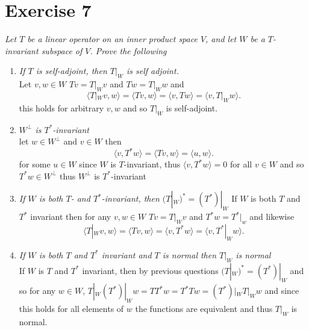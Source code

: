 \documentclass{article}
\begin{document}
    \section{Exercise 7}
    \emph{
        Let $T$ be a linear operator on an inner product space $V$, and let $W$ be a $T$-invariant
        subspace of $V$. Prove the following
    }
    \begin{enumerate}[label = (\alph*)]
        \item \emph{If $T$ is self-adjoint, then $T|_W$ is self adjoint.}\\
            Let $v,w \in W$
            $Tv = T|_Wv$ and $Tw = T|_Ww$ and
             \[
            \langle T|_W v, w \rangle = \langle Tv, w \rangle = \langle v, Tw \rangle = \langle v, T|_Ww \rangle
            .\] 
            this holds for arbitrary $v,w$ and so $T|_W$ is self-adjoint.
        \item \emph{ $W^{\perp}$ is $T^{*}$-invariant}\\
            let  $w \in W^{\perp}$ and $v \in W$ then
            \[
            \langle v, T^{*}w \rangle =\langle Tv, w \rangle = \langle u, w \rangle
            .\] 
            for some  $u \in W$ since  $W$ is $T$-invariant, thus $\langle v, T^{*}w \rangle = 0$ for all $v \in W$
            and so  $T^{*}w \in W^{\perp}$ thus $W^{\perp}$ is $T^{*}$-invariant
        \item \emph{ If $W$ is both $T$- and $T^{*}$-invariant, then $(T|_W)^{*} = (T^{*})|_W$}
            If $W$ is both $T$ and $T^{*}$ invariant then
            for any $v,w \in W$ $Tv = T|_Wv$ and $T^{*}w = T^{*}|_w$ and likewise
            \[
            \langle T|_W v,w \rangle = \langle Tv, w \rangle = \langle v, T^{*}w \rangle = \langle v, T^{*}|_W w \rangle
            .\] 
        \item \emph{ If $W$ is both $T$ and $T^{*}$ invariant and $T$ is normal then $T|_W$ is normal}\\
           If $W$ is $T$ and $T^{*}$ invariant, then  by previous questions $(T|_W)^{*} = (T^{*})|_W$
           and so
           for any $w \in W$,  $T|_W(T^{*})|_Ww = TT^{*}w = T^{*}Tw = (T^{*})|_WT|_Ww$ and since this holds for all
           elements of $w$ the functions are equivalent and thus $T|_W$ is normal.
    \end{enumerate}
\end{document}
